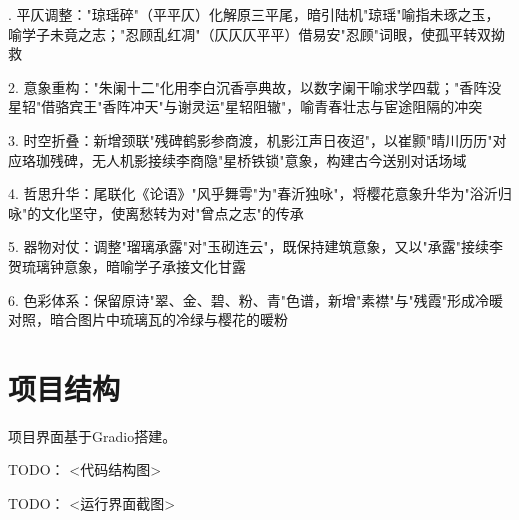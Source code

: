 \begin{tcolorbox}[
  breakable,            %
  colback=white,
  colframe=black,
  boxrule=1pt,
  arc=0mm,
  ]
  . 平仄调整："琼瑶碎"（平平仄）化解原三平尾，暗引陆机"琼瑶"喻指未琢之玉，喻学子未竟之志；"忍顾乱红凋"（仄仄仄平平）借易安"忍顾"词眼，使孤平转双拗救\par
  2. 意象重构："朱阑十二"化用李白沉香亭典故，以数字阑干喻求学四载；"香阵没星轺"借骆宾王"香阵冲天"与谢灵运"星轺阻辙"，喻青春壮志与宦途阻隔的冲突\par
  3. 时空折叠：新增颈联"残碑鹤影参商渡，机影江声日夜迢"，以崔颢"晴川历历"对应珞珈残碑，无人机影接续李商隐"星桥铁锁"意象，构建古今送别对话场域\par
  4. 哲思升华：尾联化《论语》"风乎舞雩"为"春沂独咏"，将樱花意象升华为"浴沂归咏"的文化坚守，使离愁转为对"曾点之志"的传承\par
  5. 器物对仗：调整"瑠璃承露"对"玉砌连云"，既保持建筑意象，又以"承露"接续李贺琉璃钟意象，暗喻学子承接文化甘露\par
  6. 色彩体系：保留原诗"翠、金、碧、粉、青"色谱，新增"素襟"与"残霞"形成冷暖对照，暗合图片中琉璃瓦的冷绿与樱花的暖粉\par

\end{tcolorbox}


\section{项目结构}

项目界面基于Gradio搭建。

TODO： <代码结构图>


TODO： <运行界面截图>